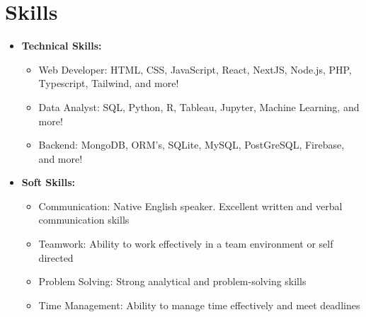 \section{Skills}

\begin{itemize}
  \item \textbf{Technical Skills:}
  \begin{itemize}
    \item Web Developer: HTML, CSS, JavaScript, React, NextJS, Node.js, PHP, Typescript, Tailwind, and more!
    \item Data Analyst: SQL, Python, R, Tableau, Jupyter, Machine Learning, and more!
    \item Backend: MongoDB, ORM's, SQLite, MySQL, PostGreSQL, Firebase, and more!
  \end{itemize}
  \item \textbf{Soft Skills:}
    \begin{itemize}
      \item Communication: Native English speaker. Excellent written and verbal communication skills
      \item Teamwork: Ability to work effectively in a team environment or self directed
      \item Problem Solving: Strong analytical and problem-solving skills
      \item Time Management: Ability to manage time effectively and meet deadlines
    \end{itemize}
\end{itemize}
